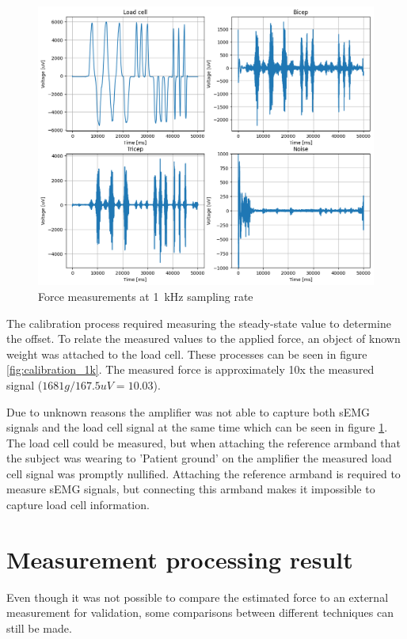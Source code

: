 \begin{figure}[h!t]
	\begin{center}
		\includegraphics[width=0.8\columnwidth]{images/measurement_meting3_1k.png}
	\end{center}
	\caption{Force measurements at \SI{1}{\kilo\hertz} sampling rate}
	\label{fig:measurement_1k}
\end{figure}

The calibration process required measuring the steady-state value to determine the offset. To relate the measured values to the applied force, an object of known weight was attached to the load cell. These processes can be seen in figure \ref{fig:calibration_1k}. The measured force is approximately 10x the measured signal ($1681g / 167.5 uV = 10.03$).

Due to unknown reasons the amplifier was not able to capture both sEMG signals and the load cell signal at the same time which can be seen in figure \ref{fig:measurement_1k}. The load cell could be measured, but when attaching the reference armband that the subject was wearing to 'Patient ground' on the amplifier the measured load cell signal was promptly nullified. Attaching the reference armband is required to measure sEMG signals, but connecting this armband makes it impossible to capture load cell information.

\section{Measurement processing result}
Even though it was not possible to compare the estimated force to an external measurement for validation, some comparisons between different techniques can still be made. 

